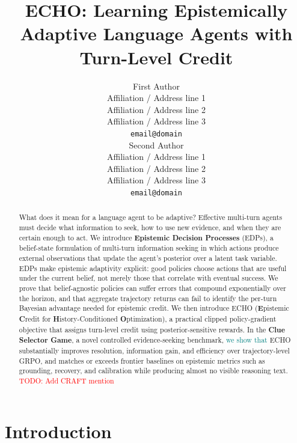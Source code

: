 \documentclass[11pt]{article}
\title{\textsc{ECHO}: Learning Epistemically Adaptive Language Agents with Turn-Level Credit
}
\author{First Author \\
  Affiliation / Address line 1 \\
  Affiliation / Address line 2 \\
  Affiliation / Address line 3 \\
  \texttt{email@domain} \\\And
  Second Author \\
  Affiliation / Address line 1 \\
  Affiliation / Address line 2 \\
  Affiliation / Address line 3 \\
  \texttt{email@domain} \\}
\newcommand{\an}[1]{\textcolor{black}{#1}}
\newcommand{\nk}[1]{\textcolor{teal}{#1}}
\newcommand{\todo}[1]{\textcolor{red}{TODO: #1}}
\theoremstyle{plain}
\theoremstyle{definition}
\theoremstyle{remark}
\begin{document}
\maketitle
\begin{abstract}
What does it mean for a language agent to be adaptive? Effective multi-turn agents must decide what information to seek, how to use new evidence, and when they are certain enough to act.
We introduce \textbf{Epistemic Decision Processes} (EDPs), a belief-state formulation of multi-turn information seeking in which actions produce external observations that update the agent's posterior over a latent task variable. EDPs make epistemic adaptivity explicit: good policies choose actions that are useful under the current belief, not merely those that correlate with eventual success. We prove that belief-agnostic policies can suffer errors that compound exponentially over the horizon, and that aggregate trajectory returns can fail to identify the per-turn Bayesian advantage needed for epistemic credit. We then introduce \textsc{ECHO} (\textbf{E}pistemic \textbf{C}redit for \textbf{H}istory-Conditioned \textbf{O}ptimization), a practical clipped policy-gradient objective that assigns turn-level credit using posterior-sensitive rewards. In the \textbf{Clue Selector Game}, a novel controlled evidence-seeking benchmark, \nk{we show that} \textsc{ECHO} substantially improves resolution, information gain, and efficiency over trajectory-level GRPO, and matches or exceeds frontier baselines on epistemic metrics such as grounding, recovery, and calibration while producing almost no visible reasoning text.
\todo{Add CRAFT mention}
\end{abstract}

\section{Introduction}
\vspace*{-2mm}

\end{document}
